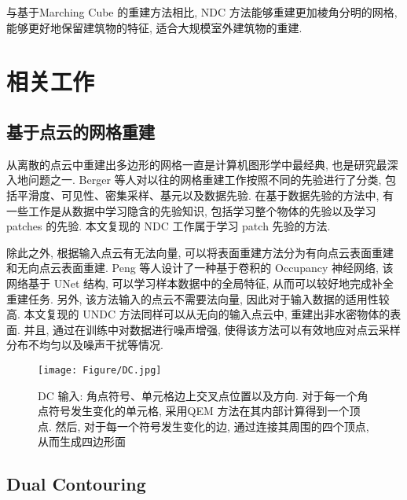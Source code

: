 与基于Marching Cube \cite{lorensen1987marching}的重建方法相比, NDC 方法能够重建更加棱角分明的网格, 能够更好地保留建筑物的特征, 适合大规模室外建筑物的重建. 

\section{相关工作}

\subsection{基于点云的网格重建}

从离散的点云中重建出多边形的网格一直是计算机图形学中最经典, 也是研究最深入地问题之一. 
Berger 等人\cite{berger2017survey}对以往的网格重建工作按照不同的先验进行了分类, 包括平滑度、可见性、密集采样、基元以及数据先验. 
在基于数据先验的方法中, 有一些工作是从数据中学习隐含的先验知识, 包括学习整个物体的先验\cite{peng2021shape}以及学习 patches 的先验\cite{Shen:2012}. 
本文复现的 NDC 工作属于学习 patch 先验的方法.

除此之外, 根据输入点云有无法向量, 可以将表面重建方法分为有向点云表面重建\cite{kazhdan2006poisson}和无向点云表面重建\cite{atzmon2020sal}. 
Peng 等人\cite{tang2021sa}设计了一种基于卷积的 Occupancy 神经网络, 该网络基于 UNet \cite{ronneberger2015u}结构, 可以学习样本数据中的全局特征, 从而可以较好地完成补全重建任务. 
另外, 该方法输入的点云不需要法向量, 因此对于输入数据的适用性较高. 本文复现的 UNDC 方法同样可以从无向的输入点云中, 重建出非水密物体的表面. 
并且, 通过在训练中对数据进行噪声增强, 使得该方法可以有效地应对点云采样分布不均匀以及噪声干扰等情况. 
\vspace{0.5em} %
\begin{figure}[H]
	\center
	\texttt{[image: Figure/DC.jpg]}
	\centering
	\caption{DC 输入: 角点符号、单元格边上交叉点位置以及方向. 对于每一个角点符号发生变化的单元格, 采用QEM 方法在其内部计算得到一个顶点. 
		然后, 对于每一个符号发生变化的边, 通过连接其周围的四个顶点, 从而生成四边形面}\label{fig:dc}
\end{figure}

\subsection{Dual Contouring}

